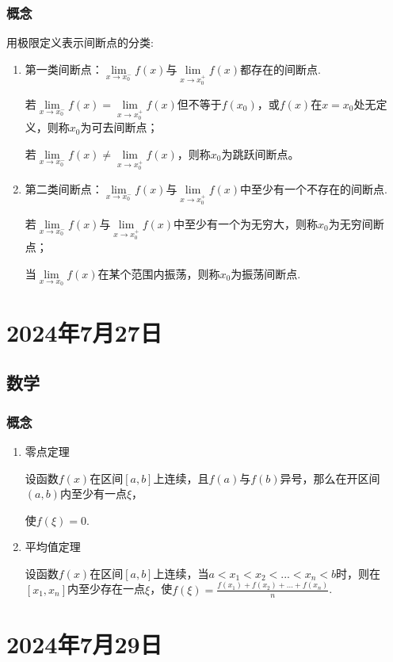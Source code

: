 \documentclass[UTF8]{ctexart}
\begin{document}
\subsubsection{概念}
用极限定义表示间断点的分类:
\begin{enumerate}
      \item 第一类间断点：$\lim\limits_{x \to x^{-}_{0}}f(x)$与$\lim\limits_{x \to x^{+}_{0}}f(x)$都存在的间断点.

            若$\lim\limits_{x \to x^{-}_{0}}f(x)=\lim\limits_{x \to x^{+}_{0}}f(x)$但不等于$f(x_0)$，或$f(x)$在$x=x_0$处无定义，则称$x_0$为可去间断点；

            若$\lim\limits_{x \to x^{-}_{0}}f(x)\ne\lim\limits_{x \to x^{+}_{0}}f(x)$，则称$x_0$为跳跃间断点。
      \item 第二类间断点：$\lim\limits_{x \to x^{-}_{0}}f(x)$与$\lim\limits_{x \to x^{+}_{0}}f(x)$中至少有一个不存在的间断点.

            若$\lim\limits_{x \to x^{-}_{0}}f(x)$与$\lim\limits_{x \to x^{+}_{0}}f(x)$中至少有一个为无穷大，则称$x_0$为无穷间断点；

            当$\lim\limits_{x \to x_{0}}f(x)$在某个范围内振荡，则称$x_0$为振荡间断点.

\end{enumerate}
\section{2024年7月27日}
\subsection{数学}
\subsubsection{概念}
\begin{enumerate}
      \item 零点定理

            设函数$f(x)$在区间$[a,b]$上连续，且$f(a)$与$f(b)$异号，那么在开区间$(a,b)$内至少有一点$\xi$，

            使$f(\xi)=0$.
      \item 平均值定理

            设函数$f(x)$在区间$[a,b]$上连续，当$a<x_1<x_2<...<x_n<b$时，则在$[x_1,x_n]$内至少存在一点$\xi$，使$f(\xi)=\frac{f(x_1)+f(x_2)+...+f(x_n)}{n}$.
\end{enumerate}
\section{2024年7月29日}
\end{document}
